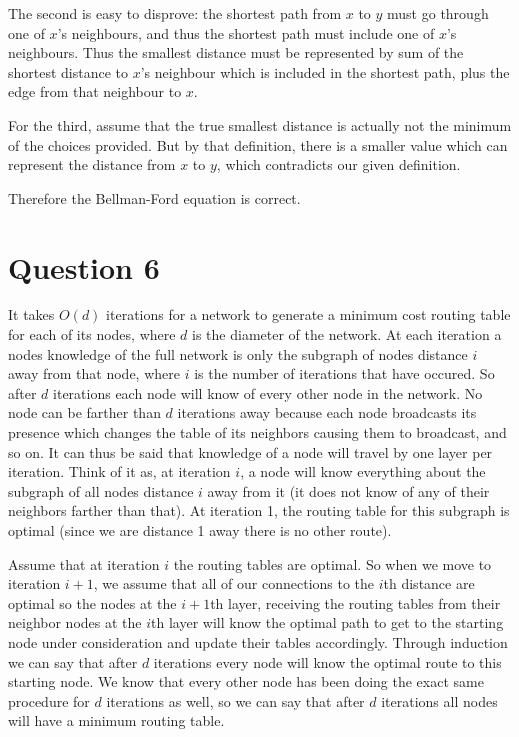 \documentclass[12pt]{article}
\begin{document}
The second is easy to disprove: the shortest path from $x$ to $y$ must go through one of $x$’s neighbours, and thus the shortest path must include one of $x$’s neighbours. Thus the smallest distance must be represented by sum of the shortest distance to $x$’s neighbour which is included in the shortest path, plus the edge from that neighbour to $x$.

For the third, assume that the true smallest distance is actually not the minimum of the choices provided. But by that definition, there is a smaller value which can represent the distance from $x$ to $y$, which contradicts our given definition.

Therefore the Bellman-Ford equation is correct.

\section*{Question 6}
It takes $O(d)$ iterations for a network to generate a minimum cost routing table for each of its nodes, where $d$ is the diameter of the network. At each iteration a nodes knowledge of the full network is only the subgraph of nodes distance $i$ away from that node, where $i$ is the number of iterations that have occured. So after $d$ iterations each node will know of every other node in the network. No node can be farther than $d$ iterations away because each node broadcasts its presence which changes the table of its neighbors causing them to broadcast, and so on. It can thus be said that knowledge of a node will travel by one layer per iteration. Think of it as, at iteration $i$, a node will know everything about the subgraph of all nodes distance $i$ away from it (it does not know of any of their neighbors farther than that). At iteration 1, the routing table for this subgraph is optimal (since we are distance 1 away there is no other route).

Assume that at iteration $i$ the routing tables are optimal. So when we move to iteration $i+1$, we assume that all of our connections to the $i$th distance are optimal so the nodes at the $i+1$th layer, receiving the routing tables from their neighbor nodes at the $i$th layer will know the optimal path to get to the starting node under consideration and update their tables accordingly. Through induction we can say that after $d$ iterations every node will know the optimal route to this starting node. We know that every other node has been doing the exact same procedure for $d$ iterations as well, so we can say that after $d$ iterations all nodes will have a minimum routing table.
\end{document}
